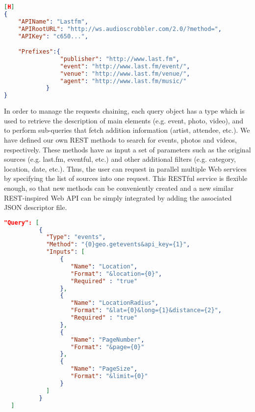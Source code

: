 \vspace{1mm}
\begin{lstlisting}[language=json,caption={Global parameters in Last.fm descriptor file},label={lst:DescFile}][H]
{
    "APIName": "Lastfm",
    "APIRootURL": "http://ws.audioscrobbler.com/2.0/?method=",
    "APIKey": "c650...",

    "Prefixes":{
                "publisher": "http://www.last.fm",
                "event": "http://www.last.fm/event/",
                "venue": "http://www.last.fm/venue/",
                "agent": "http://www.last.fm/music/"
            }
}	
\end{lstlisting}

In order to manage the requests chaining, each query object has a type which is used to retrieve the description of main elements (e.g. event, photo, video), and to perform sub-queries that fetch addition information (artist, attendee, etc.). We have defined our own REST methods to search for events, photos and videos, respectively. These methods have as input a set of parameters such as the original sources (e.g. last.fm, eventful, etc.) and other additional filters (e.g. category, location, date, etc.). Thus, the user can request in parallel multiple Web services by specifying the list of sources into one request. This RESTful service is flexible enough, so that new methods can be conveniently created and a new similar REST-inspired Web API can be simply integrated by adding the associated JSON descriptor file.

\vspace{1mm}
\begin{lstlisting}[language=json,caption={Query object for collecting events in Last.fm},label={lst:ObjectQuery}]
"Query": [
          {
            "Type": "events",
            "Method": "{0}geo.getevents&api_key={1}",
            "Inputs": [
                {
                   "Name": "Location",
                   "Format": "&location={0}",
                   "Required" : "true"
                },
                {
                   "Name": "LocationRadius",
                   "Format": "&lat={0}&long={1}&distance={2}",
                   "Required" : "true"
                },
                {
                   "Name": "PageNumber",
                   "Format": "&page={0}"
                },
                {
                   "Name": "PageSize",
                   "Format": "&limit={0}"
                }
            ]
          }
  ]	
\end{lstlisting}


